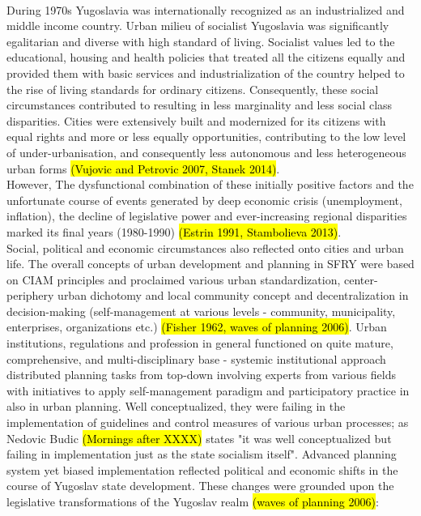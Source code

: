 \documentclass[11pt]{report}
\begin{document}
\\
During 1970s Yugoslavia was internationally recognized as an industrialized and middle income country. 
Urban milieu of socialist Yugoslavia was significantly egalitarian and diverse with high standard of living.
Socialist values led to the educational, housing and health policies that treated all the citizens equally and provided them with basic services and industrialization of the country helped to the rise of living standards for ordinary citizens.
Consequently, these social circumstances contributed to  resulting in less marginality and less social class disparities. 
Cities were extensively built and modernized for its citizens with equal rights and more or less equally opportunities, contributing to the low level of under-urbanisation, and consequently less autonomous and less heterogeneous urban forms \hl{(Vujovic and Petrovic 2007, Stanek 2014)}.
\\
However, The dysfunctional combination of these initially positive factors and the unfortunate course of events generated by deep economic crisis (unemployment, inflation), the decline of legislative power and ever-increasing regional disparities marked its final years (1980-1990) \hl{(Estrin 1991, Stambolieva 2013)}.
\\
Social, political and economic circumstances also reflected onto cities and urban life. The overall concepts of urban development and planning in SFRY were based on CIAM principles and proclaimed various urban standardization, center-periphery urban dichotomy and local community concept and decentralization in decision-making (self-management at various levels - community, municipality, enterprises, organizations etc.) \hl{(Fisher 1962, waves of planning 2006)}. Urban institutions, regulations and profession in general functioned on quite mature, comprehensive, and multi-disciplinary base - systemic institutional approach distributed planning tasks from top-down involving experts from various fields with initiatives to apply self-management paradigm and participatory practice in also in urban planning. Well conceptualized, they were failing in the implementation of guidelines and control measures of various urban processes; as Nedovic Budic \hl{(Mornings after XXXX)} states "it was well conceptualized but failing in implementation just as the state socialism itself".
Advanced planning system yet biased implementation reflected political and economic shifts in the course of Yugoslav state development. These changes were grounded upon the legislative transformations of the Yugoslav realm \hl{(waves of planning 2006)}:
\end{document}
